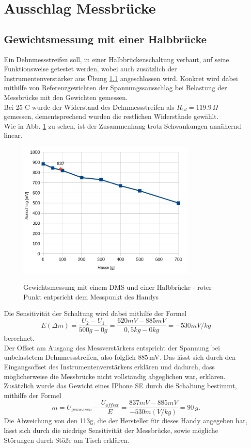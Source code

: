 \section{Ausschlag Messbrücke}
\subsection{Gewichtsmessung mit einer Halbbrücke}
Ein Dehnmessstreifen soll, in einer Halbbrückenschaltung verbaut, auf seine Funktionsweise getestet werden, wobei auch zusätzlich der Instrumentenverstärker aus Übung \ref{} angeschlossen wird. Konkret wird dabei mithilfe von Referenzgewichten der Spannungssausschlag bei Belastung der Messbrücke mit den Gewichten gemessen. \\
Bei 25 C wurde der Widerstand des Dehnmessstreifen als $R_{1d}=119.9\,\Omega$ gemessen, dementsprechend wurden die restlichen Widerstände gewählt.\\
Wie in Abb. \ref{fig:gewicht_mb} zu sehen, ist der Zusammenhang trotz Schwankungen annähernd linear. 
\begin{figure}[H]
	\includegraphics[width=0.8\textwidth]{./img/ch3/GewichtsmessungHalbbruecke_3_3_1.png}
	\centering
	\label{fig:gewicht_mb}
	\caption{Gewichtsmessung mit einem DMS und einer Halbbrücke - roter Punkt entpsricht dem Messpunkt des Handys}
\end{figure}
Die Sensitivität der Schaltung wird dabei mithilfe der Formel
\begin{equation}
	 E(\Delta m) = \frac{U_2-U_1}{500g-0g}=\frac{620mV-885mV}{0,5kg-0kg}=-530mV/kg
\end{equation}
berechnet. \\
Der Offset am Ausgang des Messverstärkers entspricht der Spannung bei unbelastetem Dehnmessstreifen, also folglich $885\,$mV. Das lässt sich durch den Eingangsoffset des Instrumentenverstärkers erklären und dadurch, dass möglicherweise die Messbrücke nicht vollständig abgeglichen war, erklären. \\
Zusätzlich wurde das Gewicht eines IPhone SE durch die Schaltung bestimmt, mithilfe der Formel
\begin{equation}
	m=U_{gemessen}-\frac{U_{offset}}{E}=\frac{837mV-885mV}{-530m(V/kg)}=90\,g.
\end{equation}
Die Abweichung von den 113g, die der Hersteller für dieses Handy angegeben hat, lässt sich durch die niedrige Sensitivität der Messbrücke, sowie mögliche Störungen durch Stöße am Tisch erklären.


